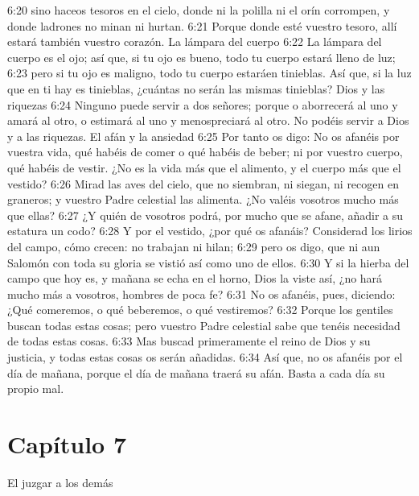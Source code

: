6:20 sino haceos tesoros en el cielo, donde ni la polilla ni el orín corrompen, y donde ladrones no minan ni hurtan. 
6:21 Porque donde esté vuestro tesoro, allí estará también vuestro corazón. 
La lámpara del cuerpo  
6:22 La lámpara del cuerpo es el ojo; así que, si tu ojo es bueno, todo tu cuerpo estará lleno de luz; 
6:23 pero si tu ojo es maligno, todo tu cuerpo estaráen tinieblas. Así que, si la luz que en ti hay es tinieblas, ¿cuántas no serán las mismas tinieblas? 
Dios y las riquezas 
6:24 Ninguno puede servir a dos señores; porque o aborrecerá al uno y amará al otro, o estimará al uno y menospreciará al otro. No podéis servir a Dios y a las riquezas. 
El afán y la ansiedad  
6:25 Por tanto os digo: No os afanéis por vuestra vida, qué habéis de comer o qué habéis de beber; ni por vuestro cuerpo, qué habéis de vestir. ¿No es la vida más que el alimento, y el cuerpo más que el vestido? 
6:26 Mirad las aves del cielo, que no siembran, ni siegan, ni recogen en graneros; y vuestro Padre celestial las alimenta. ¿No valéis vosotros mucho más que ellas? 
6:27 ¿Y quién de vosotros podrá, por mucho que se afane, añadir a su estatura un codo? 
6:28 Y por el vestido, ¿por qué os afanáis? Considerad los lirios del campo, cómo crecen: no trabajan ni hilan; 
6:29 pero os digo, que ni aun Salomón con toda su gloria se vistió así como uno de ellos. 
6:30 Y si la hierba del campo que hoy es, y mañana se echa en el horno, Dios la viste así, ¿no hará mucho más a vosotros, hombres de poca fe? 
6:31 No os afanéis, pues, diciendo: ¿Qué comeremos, o qué beberemos, o qué vestiremos? 
6:32 Porque los gentiles buscan todas estas cosas; pero vuestro Padre celestial sabe que tenéis necesidad de todas estas cosas. 
6:33 Mas buscad primeramente el reino de Dios y su justicia, y todas estas cosas os serán añadidas. 
6:34 Así que, no os afanéis por el día de mañana, porque el día de mañana traerá su afán. Basta a cada día su propio mal. 
\section*{Capítulo 7}
El juzgar a los demás 

